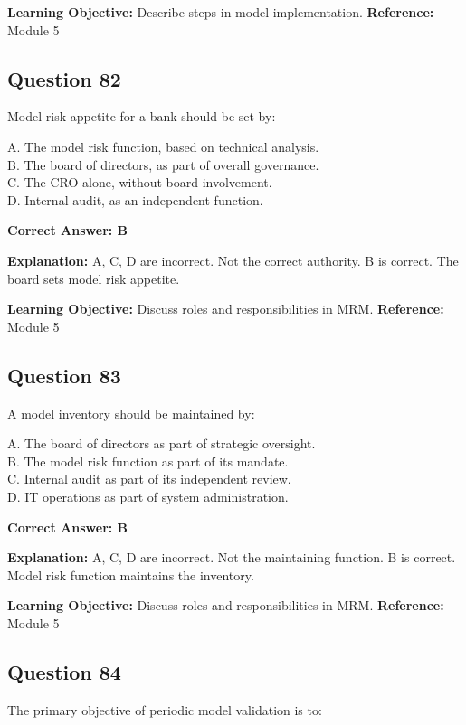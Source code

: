 \documentclass[11pt]{article}
\begin{document}
	\textbf{Learning Objective:} Describe steps in model implementation.
	\textbf{Reference:} Module 5
	
	\subsection*{Question 82}
	Model risk appetite for a bank should be set by:
	
	A. The model risk function, based on technical analysis.\\
	B. The board of directors, as part of overall governance.\\
	C. The CRO alone, without board involvement.\\
	D. Internal audit, as an independent function.
	
	\vspace{0.4em}
	\textbf{Correct Answer: B}
	
	\textbf{Explanation:}
	A, C, D are incorrect. Not the correct authority.
	B is correct. The board sets model risk appetite.
	
	\textbf{Learning Objective:} Discuss roles and responsibilities in MRM.
	\textbf{Reference:} Module 5
	
	\subsection*{Question 83}
	A model inventory should be maintained by:
	
	A. The board of directors as part of strategic oversight.\\
	B. The model risk function as part of its mandate.\\
	C. Internal audit as part of its independent review.\\
	D. IT operations as part of system administration.
	
	\vspace{0.4em}
	\textbf{Correct Answer: B}
	
	\textbf{Explanation:}
	A, C, D are incorrect. Not the maintaining function.
	B is correct. Model risk function maintains the inventory.
	
	\textbf{Learning Objective:} Discuss roles and responsibilities in MRM.
	\textbf{Reference:} Module 5
	
	\subsection*{Question 84}
	The primary objective of periodic model validation is to:
	
\end{document}
